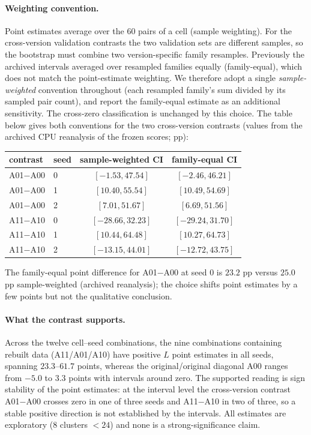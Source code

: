 \documentclass[11pt,twocolumn]{article}
\begin{document}
\paragraph{Weighting convention.} Point estimates average over the 60 pairs of
a cell (sample weighting). For the cross-version validation contrasts the two
validation sets are different samples, so the bootstrap must combine two
version-specific family resamples. Previously the archived intervals averaged
over resampled families equally (family-equal), which does not match the
point-estimate weighting. We therefore adopt a single \emph{sample-weighted}
convention throughout (each resampled family's sum divided by its sampled pair
count), and report the family-equal estimate as an additional sensitivity. The
cross-zero classification is unchanged by this choice. The table below gives
both conventions for the two cross-version contrasts (values from the archived
CPU reanalysis of the frozen scores; pp):

\begin{center}
\small
\begin{tabular}{llcc}
\toprule
contrast & seed & sample-weighted CI & family-equal CI \\
\midrule
A01$-$A00 & 0 & $[-1.53,47.54]$ & $[-2.46,46.21]$ \\
A01$-$A00 & 1 & $[10.40,55.54]$ & $[10.49,54.69]$ \\
A01$-$A00 & 2 & $[7.01,51.67]$ & $[6.69,51.56]$ \\
A11$-$A10 & 0 & $[-28.66,32.23]$ & $[-29.24,31.70]$ \\
A11$-$A10 & 1 & $[10.44,64.48]$ & $[10.27,64.73]$ \\
A11$-$A10 & 2 & $[-13.15,44.01]$ & $[-12.72,43.75]$ \\
\bottomrule
\end{tabular}
\end{center}

\noindent The family-equal point difference for A01$-$A00 at seed 0 is $23.2$ pp
versus $25.0$ pp sample-weighted (archived reanalysis); the choice shifts point
estimates by a few points but not the qualitative conclusion.

\paragraph{What the contrast supports.} Across the twelve cell--seed
combinations, the nine combinations containing rebuilt data (A11/A01/A10) have
positive $L$ point estimates in all seeds, spanning $23.3$--$61.7$ points,
whereas the original/original diagonal A00 ranges from $-5.0$ to $3.3$ points
with intervals around zero. The supported reading is sign stability of the
point estimates: at the interval level the cross-version contrast A01$-$A00
crosses zero in one of three seeds and A11$-$A10 in two of three, so a stable
positive direction is not established by the intervals. All estimates are
exploratory (8 clusters $<24$) and none is a strong-significance claim.
\end{document}
